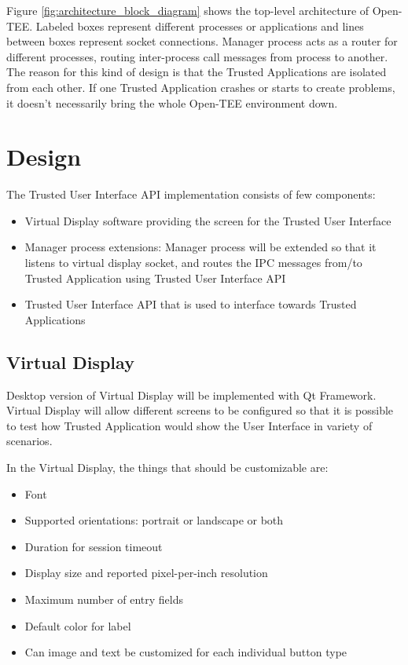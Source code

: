 \documentclass{article}
\begin{document}
Figure \ref{fig:architecture_block_diagram} shows the top-level architecture of
Open-TEE. Labeled boxes represent different processes or applications and lines
between boxes represent socket connections. Manager process acts as a router
for different processes, routing inter-process call messages from process to
another. The reason for this kind of design is that the Trusted Applications
are isolated from each other. If one Trusted Application crashes or starts to
create problems, it doesn't necessarily bring the whole Open-TEE environment
down.

\section{Design}

The Trusted User Interface API implementation consists of few components:
\begin{itemize}
    \item{Virtual Display software providing the screen for the
          Trusted User Interface}
    \item{Manager process extensions: Manager process will be extended so that
          it listens to virtual display socket, and routes the IPC messages
          from/to Trusted Application using Trusted User Interface API}
    \item{Trusted User Interface API that is used to interface towards
          Trusted Applications}
\end{itemize}

\subsection{Virtual Display}

Desktop version of Virtual Display will be implemented with Qt Framework.
Virtual Display will allow different screens to be configured so that it is
possible to test how Trusted Application would show the User Interface in
variety of scenarios.

In the Virtual Display, the things that should be customizable are:
\begin{itemize}
    \item{Font}
    \item{Supported orientations: portrait or landscape or both}
    \item{Duration for session timeout}
    \item{Display size and reported pixel-per-inch resolution}
    \item{Maximum number of entry fields}
    \item{Default color for label}
    \item{Can image and text be customized for each individual button type}
\end{itemize}
\end{document}
